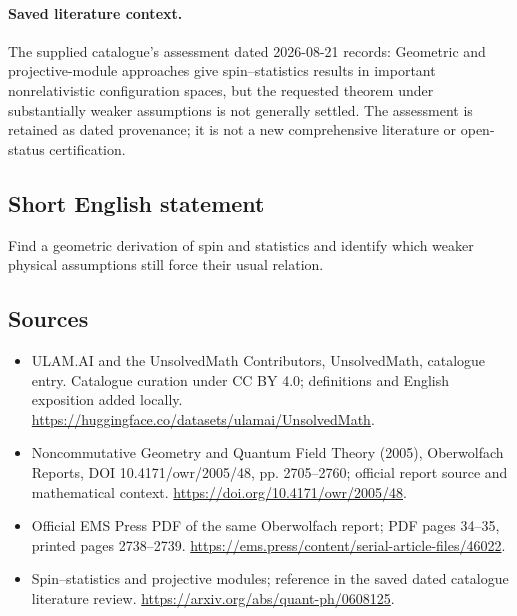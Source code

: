 \documentclass[11pt]{article}
\begin{document}
\paragraph{Saved literature context.} The supplied catalogue's assessment dated 2026-08-21 records: Geometric and projective-module approaches give spin--statistics results in important nonrelativistic configuration spaces, but the requested theorem under substantially weaker assumptions is not generally settled. The assessment is retained as dated provenance; it is not a new comprehensive literature or open-status certification.
\subsection{Short English statement}
Find a geometric derivation of spin and statistics and identify which weaker physical assumptions still force their usual relation.
\subsection{Sources}
\begin{itemize}
\item[\hypertarget{source:statement:1}{S1}] ULAM.AI and the UnsolvedMath Contributors, UnsolvedMath, catalogue entry. Catalogue curation under CC BY 4.0; definitions and English exposition added locally.
\url{https://huggingface.co/datasets/ulamai/UnsolvedMath}.
\item[\hypertarget{source:statement:2}{S2}] Noncommutative Geometry and Quantum Field Theory (2005), Oberwolfach Reports, DOI 10.4171/owr/2005/48, pp. 2705--2760; official report source and mathematical context.
\url{https://doi.org/10.4171/owr/2005/48}.
\item[\hypertarget{source:statement:3}{S3}] Official EMS Press PDF of the same Oberwolfach report; PDF pages 34--35, printed pages 2738--2739.
\url{https://ems.press/content/serial-article-files/46022}.
\item[\hypertarget{source:statement:4}{S4}] Spin--statistics and projective modules; reference in the saved dated catalogue literature review.
\url{https://arxiv.org/abs/quant-ph/0608125}.
\end{itemize}
\label{end:statement}
\end{document}
